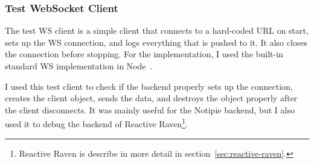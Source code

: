 \subsubsection{Test WebSocket Client}\label{sec:test-ws-client}

The test WS client
is a simple client that connects
to a hard-coded URL on start,
sets up the WS connection,
and logs everything that is pushed to it.
It also closes the connection before stopping.
For the implementation,
I used the built-in standard WS implementation
in Node~\cite{trott_node_2022}.

I used this test client
to check if the backend properly
sets up the connection,
creates the client object,
sends the data,
and destroys the object properly
after the client disconnects.
It was mainly useful for the Notipie backend,
but I also used it to debug the backend
of Reactive Raven\footnote{
  Reactive Raven is describe in more detail in section~\ref{sec:reactive-raven}.
}.
